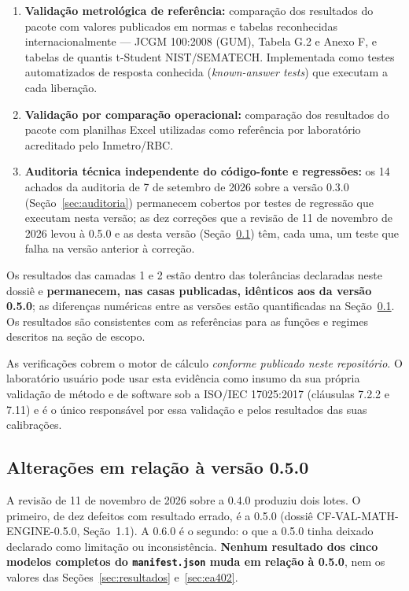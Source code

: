 \documentclass[11pt,a4paper]{article}
\newcommand{\docVersion}{0.6.0}
\newcommand{\auditDate}{7 de setembro de 2026}
\newcommand{\previousVersion}{0.5.0}
\newcommand{\auditedVersion}{0.3.0}
\newcommand{\reviewDate}{11 de novembro de 2026}
\begin{document}
\begin{enumerate}
  \item \textbf{Validação metrológica de referência:} comparação dos resultados do pacote com valores publicados em normas e tabelas reconhecidas internacionalmente --- JCGM 100:2008 (GUM), Tabela G.2 e Anexo F, e tabelas de quantis t-Student NIST/SEMATECH. Implementada como testes automatizados de resposta conhecida (\emph{known-answer tests}) que executam a cada liberação.
  \item \textbf{Validação por comparação operacional:} comparação dos resultados do pacote com planilhas Excel utilizadas como referência por laboratório acreditado pelo Inmetro/RBC.
  \item \textbf{Auditoria técnica independente do código-fonte e regressões:} os 14 achados da auditoria de \auditDate{} sobre a versão \auditedVersion{} (Seção~\ref{sec:auditoria}) permanecem cobertos por testes de regressão que executam nesta versão; as dez correções que a revisão de \reviewDate{} levou à 0.5.0 e as desta versão (Seção~\ref{sec:delta}) têm, cada uma, um teste que falha na versão anterior à correção.
\end{enumerate}

Os resultados das camadas 1 e 2 estão dentro das tolerâncias declaradas neste dossiê e \textbf{permanecem, nas casas publicadas, idênticos aos da versão \previousVersion{}}; as diferenças numéricas entre as versões estão quantificadas na Seção~\ref{sec:delta}. Os resultados são consistentes com as referências para as funções e regimes descritos na seção de escopo.

As verificações cobrem o motor de cálculo \emph{conforme publicado neste repositório}. O laboratório usuário pode usar esta evidência como insumo da sua própria validação de método e de software sob a ISO/IEC 17025:2017 (cláusulas 7.2.2 e 7.11) e é o único responsável por essa validação e pelos resultados das suas calibrações.

\subsection{Alterações em relação à versão \previousVersion}
\label{sec:delta}

A revisão de \reviewDate{} sobre a 0.4.0 produziu dois lotes. O primeiro, de dez defeitos com resultado errado, é a \previousVersion{} (dossiê CF-VAL-MATH-ENGINE-0.5.0, Seção~1.1). A \docVersion{} é o segundo: o que a \previousVersion{} tinha deixado declarado como limitação ou inconsistência. \textbf{Nenhum resultado dos cinco modelos completos do \texttt{manifest.json} muda em relação à \previousVersion{}}, nem os valores das Seções~\ref{sec:resultados} e~\ref{sec:ea402}.
\end{document}
